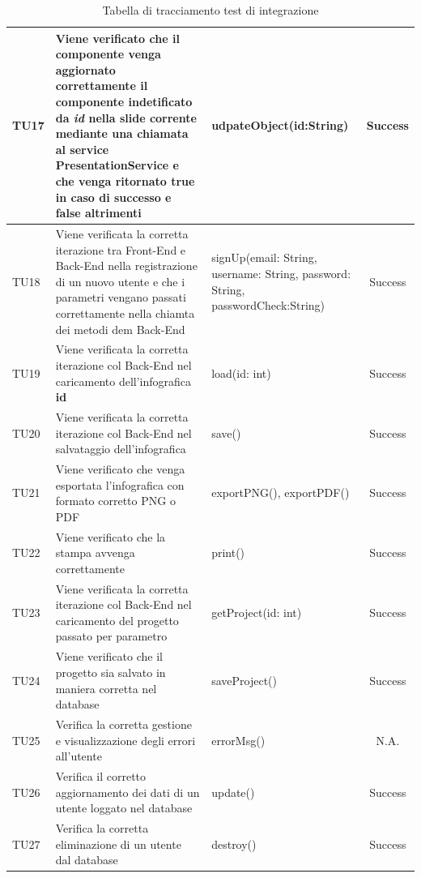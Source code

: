 \begin{table}[H]
\begin{center}
\begin{tabular}{|l|p{}|p{}|c|}
	\midrule
		TU17 & Viene verificato che il componente venga aggiornato correttamente il componente indetificato da \textit{id} nella slide corrente mediante una chiamata al service PresentationService e che venga ritornato \textbf{true} in caso di successo e \textbf{false} altrimenti & udpateObject(id:String) & Success\\
		\midrule
		TU18 & Viene verificata la corretta iterazione tra Front-End e Back-End nella registrazione di un nuovo utente e che i parametri vengano passati correttamente nella chiamta dei metodi dem Back-End & signUp(email: String, username: String, password: String, passwordCheck:String) & Success\\
		\midrule
		TU19 & Viene verificata la corretta iterazione col Back-End nel caricamento dell'infografica \textbf{id} & load(id: int) & Success\\
	\midrule
		TU20 & Viene verificata la corretta iterazione col Back-End nel salvataggio dell'infografica & save() & Success\\
	\midrule
		TU21 & Viene verificato che venga esportata l'infografica con formato corretto PNG o PDF &  exportPNG(), exportPDF() & Success\\
	\midrule
		TU22 & Viene verificato che la stampa avvenga correttamente &  print() & Success\\
	\midrule
		TU23 & Viene verificata la corretta iterazione col Back-End nel caricamento del progetto passato per parametro & getProject(id: int) & Success\\
	\midrule
		TU24 & Viene verificato che il progetto sia salvato in maniera corretta nel database &  saveProject() & Success\\
	\midrule
		TU25 & Verifica la corretta gestione e visualizzazione degli errori all'utente &  errorMsg() & N.A.\\
	\midrule
		TU26 & Verifica il corretto aggiornamento dei dati di un utente loggato nel database &  update() & Success\\
	\midrule
		TU27 & Verifica la corretta eliminazione di un utente dal database &  destroy() & Success\\
	\bottomrule
	\end{tabular}
	\end{center}
	\caption{Tabella di tracciamento test di integrazione}
\end{table}